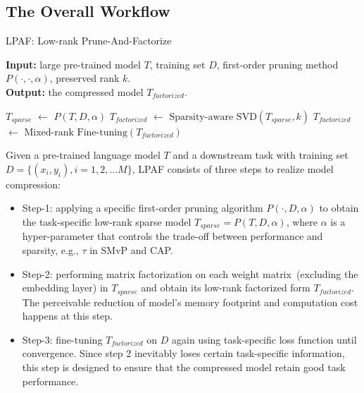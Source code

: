 \subsection{The Overall Workflow}
\label{sec:ptf}
\begin{algorithm}[h]
	\caption{LPAF: Low-rank Prune-And-Factorize} %
	\hspace*{0.02in} {\bf Input:} %
	large pre-trained model $T$, training set $D$, first-order pruning method $P(\cdot,\cdot, \alpha)$, preserved rank $k$.\\
	\hspace*{0.02in} {\bf Output:} %
	the compressed model $T_{factorized}$.
	\begin{algorithmic}[1]
		\State $T_{sparse}$ $\leftarrow$ $P(T, D, \alpha)$
		\State $T_{factorized}$ $\leftarrow$ $\text{Sparsity-aware SVD}(T_{sparse}, k)$
		\State $T_{factorized}$ $\leftarrow$ $\text{Mixed-rank Fine-tuning}(T_{factorized})$
	\end{algorithmic}
	\label{alg:lpaf}
\end{algorithm}

Given a pre-trained language model $T$ and a downstream task with training set $D=\{(x_i, y_i), i=1,2,...M\}$, LPAF consists of three steps to realize model compression: 
\begin{itemize}
	\item Step-1: applying a specific first-order pruning algorithm $P(\cdot, D, \alpha)$ to obtain the task-specific low-rank sparse model $T_{sparse}=P(T,D, \alpha)$, where $\alpha$ is a hyper-parameter that controls the trade-off between performance and sparsity, e.g., $\tau$ in SMvP and CAP. 
	\item Step-2:  performing matrix factorization on each weight matrix~(excluding the embedding layer) in $T_{sparse}$ and  obtain its low-rank factorized form $T_{factorized}$. The perceivable reduction of model's memory footprint and computation cost happens at this step.
	\item Step-3:  fine-tuning $T_{factorized}$ on $D$ again using task-specific loss function until convergence. Since step 2 inevitably loses certain task-specific information, this step is designed to ensure that the compressed model retain good task performance.
\end{itemize}


